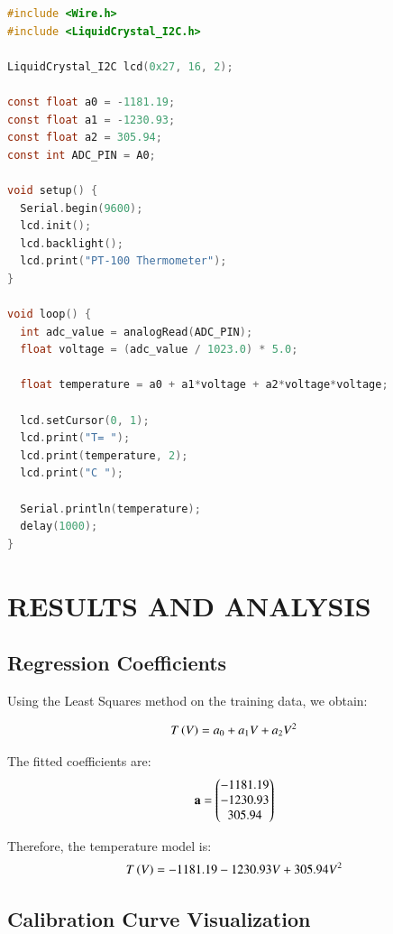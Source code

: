 \documentclass[journal]{IEEEtran}
\begin{document}
\begin{lstlisting}[language=C, frame=single, breaklines=true]
#include <Wire.h>
#include <LiquidCrystal_I2C.h>

LiquidCrystal_I2C lcd(0x27, 16, 2);

const float a0 = -1181.19;
const float a1 = -1230.93;
const float a2 = 305.94;
const int ADC_PIN = A0;

void setup() {
  Serial.begin(9600);
  lcd.init();
  lcd.backlight();
  lcd.print("PT-100 Thermometer");
}

void loop() {
  int adc_value = analogRead(ADC_PIN);
  float voltage = (adc_value / 1023.0) * 5.0;
  
  float temperature = a0 + a1*voltage + a2*voltage*voltage;
  
  lcd.setCursor(0, 1);
  lcd.print("T= ");
  lcd.print(temperature, 2);
  lcd.print("C ");
  
  Serial.println(temperature);
  delay(1000);
}
\end{lstlisting}

\section{\textbf{RESULTS AND ANALYSIS}}

\subsection{\textbf{Regression Coefficients}}

Using the Least Squares method on the training data, we obtain:

\begin{align}
T\left(V\right) = a_0 + a_1 V + a_2 V^2
\end{align}

The fitted coefficients are:
\begin{align}
\mathbf{a} = \begin{pmatrix}-1181.19 \\ -1230.93 \\ 305.94\end{pmatrix}
\end{align}

Therefore, the temperature model is:
\begin{align}
T\left(V\right) = -1181.19 - 1230.93 V + 305.94 V^2
\end{align}

\subsection{\textbf{Calibration Curve Visualization}}
\end{document}
